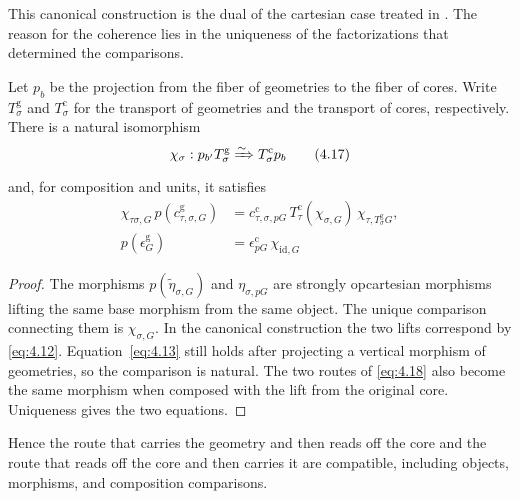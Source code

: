 This canonical construction is the dual of the cartesian case treated in
\cite[\href{https://stacks.math.columbia.edu/tag/02XJ}{Tag 02XJ, Lemmas 4.33.2 and 4.33.7}]{Stacks}.
The reason for the coherence lies in the uniqueness of the factorizations that determined
the comparisons.

\begin{theorem}\label{thm:4.16}

Let $p_b$ be the projection from the fiber of geometries to the fiber of cores.
Write $T^{\mathrm g}_\sigma$ and $T^{\mathrm c}_\sigma$ for the transport of geometries
and the transport of cores, respectively.
There is a natural isomorphism
\begin{equation*}
\chi_\sigma:p_{b'}T^{\mathrm g}_\sigma
\xRightarrow{\sim}T^{\mathrm c}_\sigma p_b
\tag{4.17}\label{eq:4.17}
\end{equation*}
and, for composition and units, it satisfies
\begin{equation*}
\begin{aligned}
\chi_{\tau\sigma,G}\,p(c^{\mathrm g}_{\tau,\sigma,G})
 &=
c^{\mathrm c}_{\tau,\sigma,pG}\,
T^{\mathrm c}_\tau(\chi_{\sigma,G})\,
\chi_{\tau,T^{\mathrm g}_\sigma G},\\
p(\epsilon^{\mathrm g}_G)
 &=\epsilon^{\mathrm c}_{pG}\,\chi_{\mathrm{id},G}
\end{aligned}
\tag{4.18}\label{eq:4.18}
\end{equation*}
\end{theorem}

\begin{proof}

The morphisms $p(\widetilde\eta_{\sigma,G})$ and $\eta_{\sigma,pG}$ are strongly
opcartesian morphisms lifting the same base morphism from the same object.
The unique comparison connecting them is $\chi_{\sigma,G}$.
In the canonical construction the two lifts correspond by \eqref{eq:4.12}.
Equation~\eqref{eq:4.13} still holds after projecting a vertical morphism of geometries,
so the comparison is natural.
The two routes of \eqref{eq:4.18} also become the same morphism when composed with the
lift from the original core.
Uniqueness gives the two equations.

\end{proof}

Hence the route that carries the geometry and then reads off the core and the route that
reads off the core and then carries it are compatible, including objects, morphisms, and
composition comparisons.


